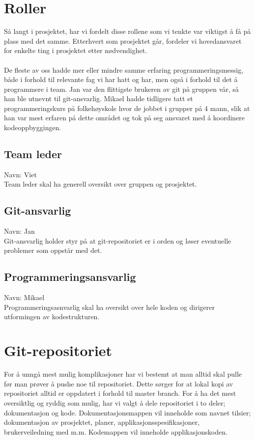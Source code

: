 \documentclass{article}
\begin{document}
\maketitle

\section*{Roller}
Så langt i prosjektet, har vi fordelt disse rollene som vi tenkte var viktigst å få på plass med det samme. Etterhvert som prosjektet går, fordeler
vi hovedansvaret for enkelte ting i prosjektet etter nødvendighet.\\\\
De fleste av oss hadde mer eller mindre samme erfaring programmeringsmessig, både i forhold til relevante fag vi har hatt og har, men også i forhold til det å programmere i team. Jan var den flittigste brukeren av git på gruppen vår, så han ble utnevnt til git-ansvarlig. Mikael hadde tidligere tatt et programmeringskurs på folkehøyskole hvor de jobbet i grupper på 4 mann, slik at han var mest erfaren på dette området og tok på seg ansvaret med å koordinere kodeoppbyggingen.
\subsection*{Team leder}
Navn: Viet\\
Team leder skal ha generell oversikt over gruppen og prosjektet.

\subsection*{Git-ansvarlig}
Navn: Jan\\
Git-ansvarlig holder styr på at git-repositoriet er i orden og løser eventuelle problemer som oppstår med det.

\subsection*{Programmeringsansvarlig}
Navn: Mikael\\
Programmeringsasnvarlig skal ha oversikt over hele koden og dirigerer utformingen av kodestrukturen.

\section*{Git-repositoriet}
For å unngå mest mulig komplikasjoner har vi bestemt at man alltid skal pulle før man prøver å pushe noe til repositoriet. Dette sørger for at lokal kopi av repositoriet alltid er oppdatert i forhold til master branch. For å ha det mest oversiktlig og ryddig som mulig, har vi valgt å dele repositoriet i to deler; dokumentasjon og kode. Dokumentasjonsmappen vil inneholde som navnet tilsier; dokumentasjon av prosjektet, planer, applikasjonsspesifikasjoner, brukerveiledning med m.m. Kodemappen vil inneholde applikasjonskoden.
\end{document}
